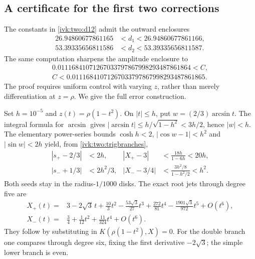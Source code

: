\documentclass[11pt,letterpaper]{article}
\theoremstyle{remark}\newtheorem{remark}[theorem]{Remark}
\begin{document}
\subsection{A certificate for the first two corrections}
The constants in \eqref{ivk:two:d12} admit the outward enclosures
\begin{equation}\label{ivk:two:dintervals}
\begin{aligned}
 26.94860677861165&<d_1<26.94860677861166,\\
 53.39335656811586&<d_2<53.39335656811587.
\end{aligned}
\end{equation}
The same computation sharpens the amplitude enclosure to
\begin{equation}\label{ivk:two:Csharper}
\begin{gathered}
 0.01116841071267033797867998293487861864<C,\\
 C<0.01116841071267033797867998293487861865.
\end{gathered}
\end{equation}
The proof requires uniform control with varying $z$, rather than
merely differentiation at $z=\rho$. We give the full error construction.

Set $h=10^{-5}$ and $z(t)=\rho(1-t^2)$. On $|t|\le h$, put
$w=(2/3)\arcsin t$. The integral formula for $\arcsin$ gives
$|\arcsin t|\le h/\sqrt{1-h^2}<3h/2$, hence $|w|<h$.
The elementary power-series bounds $\cosh h<2$,
$|\cos w-1|<h^2$ and $|\sin w|<2h$ yield, from
\eqref{ivk:two:trigbranches},
\begin{equation}\label{ivk:two:rootdiskbounds}
\begin{aligned}
 |s_+-2/3|&<2h,& |X_+-3|&<\frac{18h}{1-6h}<20h,\\
 |s_-+1/3|&<2h^2/3,& |X_--3/4|&<\frac{3h^2/8}{1-h^2/2}<h^2.
\end{aligned}
\end{equation}
Both seeds stay in the radius-$1/1000$ disks. The exact root jets
through degree five are
\begin{equation}\label{ivk:two:rootjets}
\begin{aligned}
 X_+(t)={}&3-2\sqrt3\,t+\frac{10}{3}t^2
   -\frac{53\sqrt3}{27}t^3+\frac{272}{81}t^4
   -\frac{1901\sqrt3}{972}t^5+O(t^6),\\
 X_-(t)={}&\frac34+\frac1{12}t^2+\frac{11}{324}t^4+O(t^6).
\end{aligned}
\end{equation}
They follow by substituting in $K(\rho(1-t^2),X)=0$. For the double
branch one compares through degree six, fixing the first derivative
$-2\sqrt3$; the simple lower branch is even.
\end{document}
